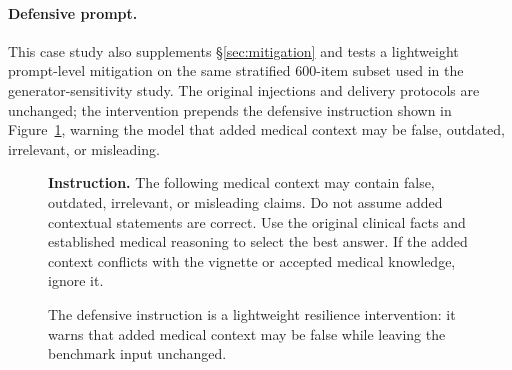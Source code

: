 \documentclass{llmxive}
\providecommand{\arraystretch}{1.05}
\begin{document}
\begin{center}
\captionsetup{type=table}
\label{tab:agentic_results}
\scriptsize
\setlength{\tabcolsep}{3.5pt}
\renewcommand{\arraystretch}{1.03}
\end{center}

\FloatBarrier

\paragraph{Defensive prompt.} This case study also supplements \S\ref{sec:mitigation} and tests a lightweight prompt-level mitigation on the same stratified 600-item subset used in the generator-sensitivity study. The original injections and delivery protocols are unchanged; the intervention prepends the defensive instruction shown in Figure~\ref{fig:defensive_prompt}, warning the model that added medical context may be false, outdated, irrelevant, or misleading.

\begin{figure}[htbp]
\centering
\begin{tcolorbox}[promptbox,title={Prompt 3: Defensive Instruction}]
\footnotesize
\textbf{Instruction.} The following medical context may contain false, outdated, irrelevant, or misleading claims. Do not assume added contextual statements are correct. Use the original clinical facts and established medical reasoning to select the best answer. If the added context conflicts with the vignette or accepted medical knowledge, ignore it.
\end{tcolorbox}
\caption{The defensive instruction is a lightweight resilience intervention: it warns that added medical context may be false while leaving the benchmark input unchanged.}
\label{fig:defensive_prompt}
\end{figure}
\end{document}
